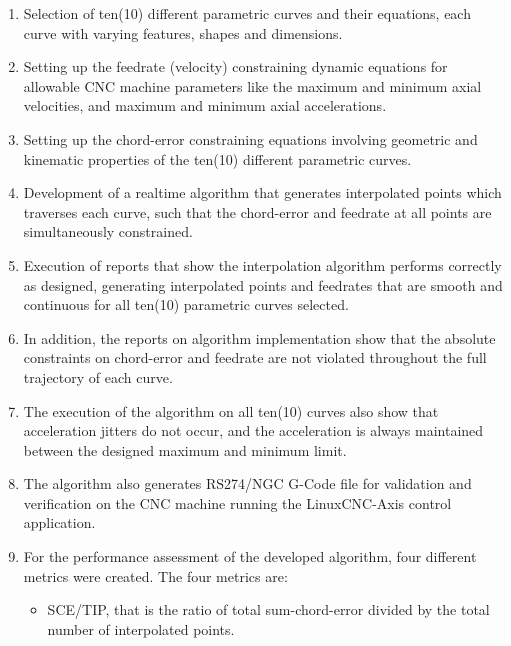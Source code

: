 \begin{enumerate}
	\item Selection of ten(10) different parametric curves and their equations, each curve with varying features, shapes and dimensions.
	
	\item Setting up the feedrate (velocity) constraining dynamic equations for allowable CNC machine parameters like the maximum and minimum axial velocities, and maximum and minimum axial accelerations.  
	
	\item Setting up the chord-error constraining equations involving geometric and kinematic properties of the ten(10) different parametric curves.
	
	\item Development of a realtime algorithm that generates interpolated points which traverses each curve, such that the chord-error and feedrate at all points are simultaneously constrained.  
	
	\item Execution of reports that show the interpolation algorithm performs correctly as designed, generating interpolated points and feedrates that are smooth and continuous for all ten(10) parametric curves selected. 
	
	\item In addition, the reports on algorithm implementation show that the absolute constraints on chord-error and feedrate are not violated throughout the full trajectory of each curve. 
	
	\item The execution of the algorithm on all ten(10) curves also show that acceleration jitters do not occur, and the acceleration is always maintained between the designed maximum and minimum limit.   
	
	\item The algorithm also generates RS274/NGC G-Code file for validation and verification on the CNC machine running the LinuxCNC-Axis control application.
	
	\item For the performance assessment of the developed algorithm, four different metrics were created. The four metrics are:
	
	\begin{itemize}
		\item SCE/TIP, that is the ratio of total sum-chord-error divided by the total number of interpolated points.
		

\end{itemize}
\end{enumerate}
